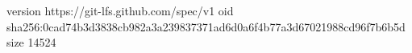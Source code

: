 version https://git-lfs.github.com/spec/v1
oid sha256:0cad74b3d3838cb982a3a239837371ad6d0a6f4b77a3d67021988cd96f7b6b5d
size 14524
